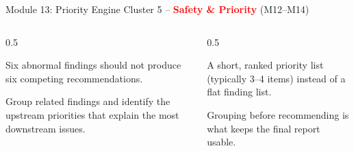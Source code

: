 \documentclass[9pt,aspectratio=169]{beamer}
\begin{document}
\begin{frame}{Module 13: Priority Engine}
\textcolor{black!55}{\scriptsize Cluster 5 -- \textcolor{red}{\textbf{Safety \& Priority}} (M12--M14)}\\[2pt]
\begin{columns}[T,onlytextwidth]
\begin{column}{0.5\textwidth}
\begin{tcolorbox}[colback=blue!7,colframe=blue!55!black,title=\textbf{Motivation},boxrule=0.6pt,arc=1mm,left=5pt,right=5pt,top=3pt,bottom=3pt,fonttitle=\small]
\footnotesize Six abnormal findings should not produce six competing recommendations.
\end{tcolorbox}
\vspace{5pt}
\begin{tcolorbox}[colback=teal!7,colframe=teal!55!black,title=\textbf{Method},boxrule=0.6pt,arc=1mm,left=5pt,right=5pt,top=3pt,bottom=3pt,fonttitle=\small]
\footnotesize Group related findings and identify the upstream priorities that explain the most downstream issues.
\end{tcolorbox}
\end{column}
\begin{column}{0.5\textwidth}
\begin{tcolorbox}[colback=green!8,colframe=green!45!black,title=\textbf{Result},boxrule=0.6pt,arc=1mm,left=5pt,right=5pt,top=3pt,bottom=3pt,fonttitle=\small]
\footnotesize A short, ranked priority list (typically 3--4 items) instead of a flat finding list.
\end{tcolorbox}
\vspace{5pt}
\begin{tcolorbox}[colback=orange!10,colframe=orange!65!black,title=\textbf{Conclusion},boxrule=0.6pt,arc=1mm,left=5pt,right=5pt,top=3pt,bottom=3pt,fonttitle=\small]
\footnotesize Grouping before recommending is what keeps the final report usable.
\end{tcolorbox}
\end{column}
\end{columns}
\end{frame}
\end{document}
